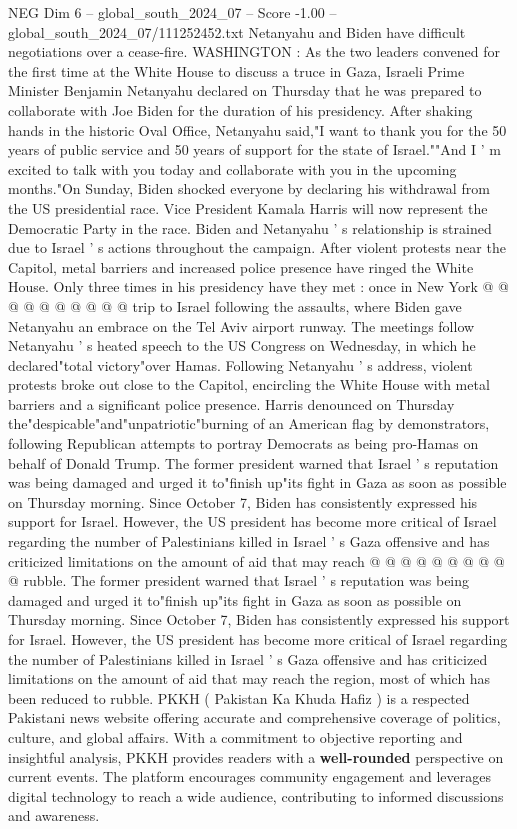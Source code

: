 \begin{textsample}{NEG Dim 6 – global\_south\_2024\_07 – Score -1.00 – global\_south\_2024\_07/111252452.txt}  \label{ex:f6_neg_124}
Netanyahu and Biden have difficult negotiations over a cease-fire.
WASHINGTON : As the two leaders convened for the first time at the White House to discuss a truce in Gaza, Israeli Prime Minister Benjamin Netanyahu declared on Thursday that he was prepared to collaborate with Joe Biden for the duration of his presidency.
After shaking hands in the historic Oval Office, Netanyahu said,"I want to thank you for the 50 years of public service and 50 years of support for the state of Israel.""And I ' m excited to talk with you today and collaborate with you in the upcoming months."On Sunday, Biden shocked everyone by declaring his withdrawal from the US presidential race.
Vice President Kamala Harris will now represent the Democratic Party in the race.
Biden and Netanyahu ' s relationship is strained due to Israel ' s actions throughout the campaign.
After violent protests near the Capitol, metal barriers and increased police presence have ringed the White House.
Only three times in his presidency have they met : once in New York @ @ @ @ @ @ @ @ @ @ trip to Israel following the assaults, where Biden gave Netanyahu an embrace on the Tel Aviv airport runway.
The meetings follow Netanyahu ' s heated speech to the US Congress on Wednesday, in which he declared"total victory"over Hamas.
Following Netanyahu ' s address, violent protests broke out close to the Capitol, encircling the White House with metal barriers and a significant police presence.
Harris denounced on Thursday the"despicable"and"unpatriotic"burning of an American flag by demonstrators, following Republican attempts to portray Democrats as being pro-Hamas on behalf of Donald Trump.
The former president warned that Israel ' s reputation was being damaged and urged it to"finish up"its fight in Gaza as soon as possible on Thursday morning.
Since October 7, Biden has consistently expressed his support for Israel.
However, the US president has become more critical of Israel regarding the number of Palestinians killed in Israel ' s Gaza offensive and has criticized limitations on the amount of aid that may reach @ @ @ @ @ @ @ @ @ @ rubble.
The former president warned that Israel ' s reputation was being damaged and urged it to"finish up"its fight in Gaza as soon as possible on Thursday morning.
Since October 7, Biden has consistently expressed his support for Israel.
However, the US president has become more critical of Israel regarding the number of Palestinians killed in Israel ' s Gaza offensive and has criticized limitations on the amount of aid that may reach the region, most of which has been reduced to rubble.
PKKH ( Pakistan Ka Khuda Hafiz ) is a respected Pakistani news website offering accurate and comprehensive coverage of politics, culture, and global affairs.
With a commitment to objective reporting and insightful analysis, PKKH provides readers with a \textbf{well-rounded} perspective on current events.
The platform encourages community engagement and leverages digital technology to reach a wide audience, contributing to informed discussions and awareness.

\end{textsample}

